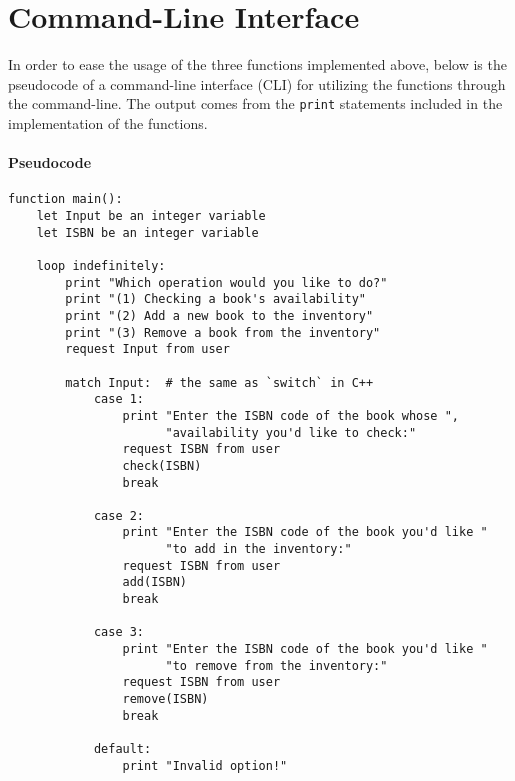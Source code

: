 \documentclass[12pt]{article}
\begin{document}
\pagebreak
\section{Command-Line Interface}

In order to ease the usage of the three functions implemented above, below is the pseudocode of a command-line interface (CLI) for utilizing the functions through the command-line. The output comes from the \texttt{print} statements included in the implementation of the functions.

\paragraph{Pseudocode}
\begin{verbatim}
function main():
    let Input be an integer variable
    let ISBN be an integer variable

    loop indefinitely:
        print "Which operation would you like to do?"
        print "(1) Checking a book's availability"
        print "(2) Add a new book to the inventory"
        print "(3) Remove a book from the inventory"
        request Input from user

        match Input:  # the same as `switch` in C++
            case 1:
                print "Enter the ISBN code of the book whose ",
                      "availability you'd like to check:"
                request ISBN from user
                check(ISBN)
                break

            case 2:
                print "Enter the ISBN code of the book you'd like "
                      "to add in the inventory:"
                request ISBN from user
                add(ISBN)
                break
            
            case 3:
                print "Enter the ISBN code of the book you'd like "
                      "to remove from the inventory:"
                request ISBN from user
                remove(ISBN)
                break
            
            default:
                print "Invalid option!"
\end{verbatim}
\end{document}

